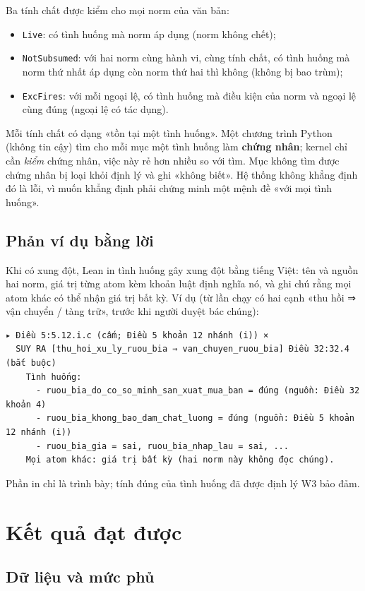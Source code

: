 \documentclass[12pt,a4paper]{article}
\newcommand{\code}[1]{\texttt{#1}}
\newcommand{\term}[1]{\textbf{#1}}
\begin{document}
Ba tính chất được kiểm cho mọi norm của văn bản:
\begin{itemize}
  \item \code{Live}: có tình huống mà norm áp dụng (norm không chết);
  \item \code{NotSubsumed}: với hai norm cùng hành vi, cùng tính chất, có tình huống mà norm thứ nhất áp dụng còn norm thứ hai
    thì không (không bị bao trùm);
  \item \code{ExcFires}: với mỗi ngoại lệ, có tình huống mà điều kiện của norm và ngoại lệ cùng đúng (ngoại lệ có tác dụng).
\end{itemize}
Mỗi tính chất có dạng «tồn tại một tình huống». Một chương trình Python (không tin cậy) tìm cho mỗi mục một tình huống làm
\term{chứng nhân}; kernel chỉ cần \emph{kiểm} chứng nhân, việc này rẻ hơn nhiều so với tìm. Mục không tìm được chứng nhân bị
loại khỏi định lý và ghi «không biết». Hệ thống không khẳng định đó là lỗi, vì muốn khẳng định phải chứng minh một mệnh đề
«với mọi tình huống».

\subsection{Phản ví dụ bằng lời}

Khi có xung đột, Lean in tình huống gây xung đột bằng tiếng Việt: tên và nguồn hai norm, giá trị từng atom kèm khoản luật
định nghĩa nó, và ghi chú rằng mọi atom khác có thể nhận giá trị bất kỳ. Ví dụ (từ lần chạy có hai cạnh «thu hồi ⇒ vận
chuyển / tàng trữ», trước khi người duyệt bác chúng):
\begin{Verbatim}
▸ Điều 5:5.12.i.c (cấm; Điều 5 khoản 12 nhánh (i)) ×
  SUY RA [thu_hoi_xu_ly_ruou_bia ⇒ van_chuyen_ruou_bia] Điều 32:32.4 (bắt buộc)
    Tình huống:
      - ruou_bia_do_co_so_minh_san_xuat_mua_ban = đúng (nguồn: Điều 32 khoản 4)
      - ruou_bia_khong_bao_dam_chat_luong = đúng (nguồn: Điều 5 khoản 12 nhánh (i))
      - ruou_bia_gia = sai, ruou_bia_nhap_lau = sai, ...
    Mọi atom khác: giá trị bất kỳ (hai norm này không đọc chúng).
\end{Verbatim}
Phần in chỉ là trình bày; tính đúng của tình huống đã được định lý W3 bảo đảm.

\section{Kết quả đạt được}

\subsection{Dữ liệu và mức phủ}
\end{document}

